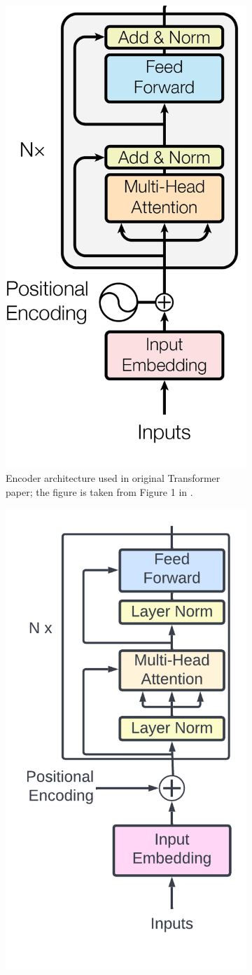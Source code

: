 \begin{figure}[!h]
\begin{subfigure}{0.5\textwidth}
    \centering
    \includegraphics[width=0.5\linewidth]{modeling/transformer.png}  
    \caption{Encoder architecture used in original Transformer paper; the figure is taken from Figure 1 in \cite{attentionAllYouNeed}.}
    \label{modeling.transformer.origEncoder}
\end{subfigure}
\hspace{5mm}
\begin{subfigure}{0.5\textwidth}
    \centering
    \includegraphics[width=0.5\linewidth]{modeling/clip_text_transformer.png}   

\end{subfigure}
\end{figure}
